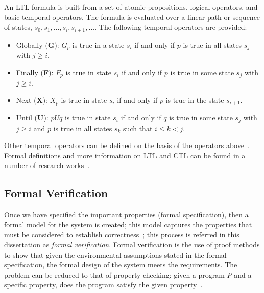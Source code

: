 An LTL formula is built from a set of atomic propositions, logical operators, and basic temporal operators. The formula is evaluated over a linear path or sequence of states, $s_0, s_1, ..., s_i ,s_{i+1},...$. The following temporal operators are provided:
\begin{itemize}
    \item Globally (\textbf{G}): $G_p$ is true in a state $s_i$ if and only if $p$ is true in all states $s_j$ with $j \geq i$.
    
    \item Finally (\textbf{F}): $F_p$ is true in state $s_i$ if and only if $p$ is true in some state $s_j$ with $j \geq i$.
    
    \item Next (\textbf{X}): $X_p$ is true in state $s_i$ if and only if $p$ is true in the state $s_{i+1}$. 
    
    \item Until (\textbf{U}): $pUq$ is true in state $s_i$ if and only if $q$ is true in some state $s_j$ with $j \geq i$ and $p$ is true in all states $s_k$ such that $i \leq k < j$.
\end{itemize}

Other temporal operators can be defined on the basis of the operators above~\cite{sistla1985complexity}. Formal definitions and more information on LTL and CTL can be found in a number of research works~\cite{Bozzano:2010:DSA:1951720, clarke2018model}.

\subsection{Formal Verification} 
\label{sec:formalVer}
Once we have specified the important properties (formal specification), then a formal model for the system is created; this model captures the properties that must be considered to establish correctness~\cite{clarke2018model}; this process is referred in this dissertation as \emph{formal verification}. Formal verification is the use of proof methods to show that given the environmental assumptions stated in the formal specification, the formal design of the system meets the requirements. The problem can be reduced to that of property checking: given a program $P$ and a specific property, does the program satisfy the given property~\cite{fitting2012first}.  


